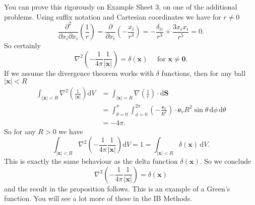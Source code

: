 You can prove this rigorously on Example Sheet 3, on one of the additional problems. Using suffix notation and Cartesian coordinates we have for $r \neq 0$
\[
\frac{\partial^{2}}{\partial x_{i} \partial x_{i}}\left(\frac{1}{r}\right)=\frac{\partial}{\partial x_{i}}\left(-\frac{x_{i}}{r^{3}}\right)=-\frac{\delta_{i i}}{r^{3}}+\frac{3 x_{i} x_{i}}{r^{5}}=0.
\]
So certainly
\[
\nabla^{2}\left(-\frac{1}{4 \pi} \frac{1}{|\mathbf{x}|}\right)=\delta(\mathbf{x}) \quad \text { for } \mathbf{x} \neq \mathbf{0}.
\]
If we assume the divergence theorem works with $ \delta $ functions, then for any ball $|\mathbf{x}|<R$
\[
\begin{aligned}
\int_{|\mathbf{x}|<R} \nabla^{2}\left(\frac{1}{|\mathbf{x}|}\right) \mathrm{d} V &=\int_{|\mathbf{x}|=R} \nabla\left(\frac{1}{r}\right) \cdot \mathrm{d} \mathbf{S} \\
&=\int_{\theta=0}^{\pi} \int_{\phi=0}^{2 \pi}\left(-\frac{\mathbf{e}_{r}}{R^{2}}\right) \cdot \mathbf{e}_{r} R^{2} \sin \theta \,\mathrm{d} \phi \,\mathrm{d} \theta \\
&=-4 \pi.
\end{aligned}
\]
So for any $R>0$ we have
\[
\int_{|\mathbf{x}|<R} \nabla^{2}\left(-\frac{1}{4 \pi} \frac{1}{|\mathbf{x}|}\right) \mathrm{d} V=1=\int_{|\mathbf{x}|<R} \delta(\mathbf{x}) \,\mathrm{d} V.
\]
This is exactly the same behaviour as the delta function $\delta(\mathbf{x}) .$ So we conclude
\[
\nabla^{2}\left(-\frac{1}{4 \pi} \frac{1}{|\mathbf{x}|}\right)=\delta(\mathbf{x})
\]
and the result in the proposition follows. This is an example of a Green's function. You will see a lot more of these in the IB Methods.